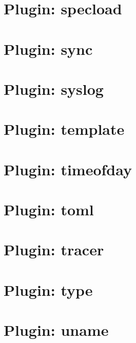 \let\mypdfximage\pdfximage\def\pdfximage{\immediate\mypdfximage}\documentclass[twoside]{book}
\newcommand{\+}{\discretionary{\mbox{\scriptsize$\hookleftarrow$}}{}{}}
\begin{document}
\chapter{Plugin\+: specload}
\label{md_src_plugins_specload_README}

\chapter{Plugin\+: sync}
\label{md_src_plugins_sync_README}

\chapter{Plugin\+: syslog}
\label{md_src_plugins_syslog_README}

\chapter{Plugin\+: template}
\label{md_src_plugins_template_README}

\chapter{Plugin\+: timeofday}
\label{md_src_plugins_timeofday_README}

\chapter{Plugin\+: toml}
\label{md_src_plugins_toml_README}

\chapter{Plugin\+: tracer}
\label{md_src_plugins_tracer_README}

\chapter{Plugin\+: type}
\label{md_src_plugins_type_README}

\chapter{Plugin\+: uname}
\label{md_src_plugins_uname_README}

\end{document}
